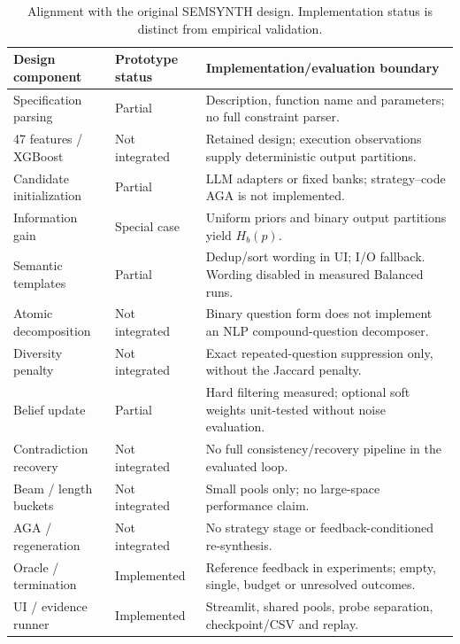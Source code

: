 \begin{table}[t]
\centering
\caption{Alignment with the original SEMSYNTH design. Implementation status is distinct from empirical validation.}
\label{tab:implementation_scope}
\footnotesize
\begin{tabularx}{\textwidth}{@{}p{}p{}X@{}}
\toprule
Design component & Prototype status & Implementation/evaluation boundary \\ \midrule
Specification parsing & Partial & Description, function name and parameters; no full constraint parser. \\
47 features / XGBoost & Not integrated & Retained design; execution observations supply deterministic output partitions. \\
Candidate initialization & Partial & LLM adapters or fixed banks; strategy--code AGA is not implemented. \\
Information gain & Special case & Uniform priors and binary output partitions yield $H_b(p)$. \\
Semantic templates & Partial & Dedup/sort wording in UI; I/O fallback. Wording disabled in measured Balanced runs. \\
Atomic decomposition & Not integrated & Binary question form does not implement an NLP compound-question decomposer. \\
Diversity penalty & Not integrated & Exact repeated-question suppression only, without the Jaccard penalty. \\
Belief update & Partial & Hard filtering measured; optional soft weights unit-tested without noise evaluation. \\
Contradiction recovery & Not integrated & No full consistency/recovery pipeline in the evaluated loop. \\
Beam / length buckets & Not integrated & Small pools only; no large-space performance claim. \\
AGA / regeneration & Not integrated & No strategy stage or feedback-conditioned re-synthesis. \\
Oracle / termination & Implemented & Reference feedback in experiments; empty, single, budget or unresolved outcomes. \\
UI / evidence runner & Implemented & Streamlit, shared pools, probe separation, checkpoint/CSV and replay. \\
\bottomrule
\end{tabularx}
\end{table}
